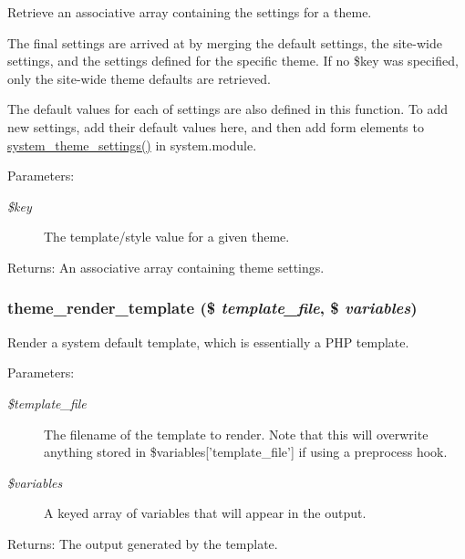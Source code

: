 Retrieve an associative array containing the settings for a theme.

The final settings are arrived at by merging the default settings, the site-wide settings, and the settings defined for the specific theme. If no \$key was specified, only the site-wide theme defaults are retrieved.

The default values for each of settings are also defined in this function. To add new settings, add their default values here, and then add form elements to \hyperlink{group__forms_g7cc637f50b1399befe30a24af784817b}{system\_\-theme\_\-settings()} in system.module.

\begin{Desc}
\item[Parameters:]
\begin{description}
\item[{\em \$key}]The template/style value for a given theme.\end{description}
\end{Desc}
\begin{Desc}
\item[Returns:]An associative array containing theme settings. \end{Desc}
\hypertarget{includes_2theme_8inc_726ca00e65b455bb895c8abf1dfb1df2}{
\subsubsection[{theme\_\-render\_\-template}]{\setlength{\rightskip}{0pt plus 5cm}theme\_\-render\_\-template (\$ {\em template\_\-file}, \/  \$ {\em variables})}}
\label{includes_2theme_8inc_726ca00e65b455bb895c8abf1dfb1df2}


Render a system default template, which is essentially a PHP template.

\begin{Desc}
\item[Parameters:]
\begin{description}
\item[{\em \$template\_\-file}]The filename of the template to render. Note that this will overwrite anything stored in \$variables\mbox{[}'template\_\-file'\mbox{]} if using a preprocess hook. \item[{\em \$variables}]A keyed array of variables that will appear in the output.\end{description}
\end{Desc}
\begin{Desc}
\item[Returns:]The output generated by the template. \end{Desc}
